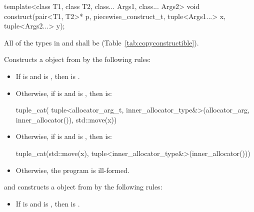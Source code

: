 %
\begin{itemdecl}
template<class T1, class T2, class... Args1, class... Args2>
  void construct(pair<T1, T2>* p, piecewise_construct_t, tuple<Args1...> x, tuple<Args2...> y);
\end{itemdecl}

\begin{itemdescr}
\pnum
\requires All of the types in  and  shall be
 (Table~\ref{tab:copyconstructible}).

\pnum
\effects Constructs a  object  from  by the
following rules:
\begin{itemize}
\item If  is  and
 is ,
then  is .

\item Otherwise, if  is 
and
is
, then  is:
\begin{codeblock}
tuple_cat(
    tuple<allocator_arg_t, inner_allocator_type&>(allocator_arg, inner_allocator()),
    std::move(x))
\end{codeblock}

\item Otherwise, if  is
 and
 is ,
then  is:
\begin{codeblock}
tuple_cat(std::move(x), tuple<inner_allocator_type&>(inner_allocator()))
\end{codeblock}

\item Otherwise, the program is ill-formed.
\end{itemize}
and constructs a  object  from  by the following rules:
\begin{itemize}
\item If  is  and
 is , then  is .


\end{itemize}
\end{itemdescr}
